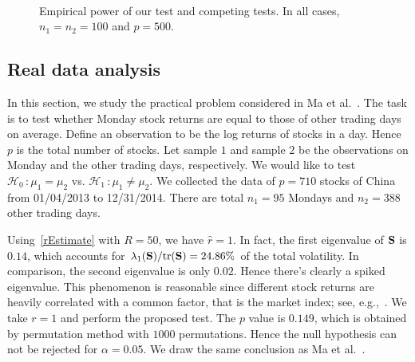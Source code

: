 \documentclass[times,sort&compress,3p]{elsarticle}
\newcommand{\mytr}{ {\rm tr} }
\theoremstyle{plain}
\theoremstyle{definition}
\theoremstyle{remark}
\begin{document}
\begin{figure}
    \\
    \caption{Empirical power of our test and competing tests. In all cases, $n_1=n_2=100$ and $p=500$.}\label{fig:Power2}
\end{figure}



\subsection{Real data analysis}
In this section, we study the practical problem considered in Ma {\rm et al.}~\cite{Ma2015A}.
The task is to test whether Monday stock returns are equal to those of other trading days on average.
Define an observation to be the log returns of stocks in a day.
Hence $p$ is the total number of stocks.
Let sample $1$ and sample $2$ be the observations on Monday and the other trading days, respectively.
We would like to test $\mathcal{H}_0\, :\mu_1=\mu_2$ vs. $\mathcal{H}_1\,:\mu_1\neq \mu_2$.
We collected the data of $p=710$
 stocks of China
from 01/04/2013 to 12/31/2014. There are total $n_1=95$ Mondays and $n_2=388$ other trading days. 


Using~\eqref{rEstimate} with $R=50$, we have $\hat{r}=1$.
In fact, the first eigenvalue of $\mathbf{S}$ is $0.14$, which accounts for $\lambda_1(\BS)/\mytr(\BS)=24.86\%$ of the total volatility.
In comparison, the second eigenvalue is only $0.02$.
Hence there's clearly a spiked eigenvalue.
This phenomenon is reasonable since different stock returns are heavily correlated with a common factor, that is the market index; see, e.g.,~\cite{Ma2015A}.
We take $r=1$ and perform the proposed test.
The $p$ value is $0.149$, which is obtained by permutation method with $1000$ permutations.
Hence the null hypothesis can not be rejected for $\alpha=0.05$.
We draw the same conclusion as Ma {\rm et al.}~\cite{Ma2015A}.
\end{document}
